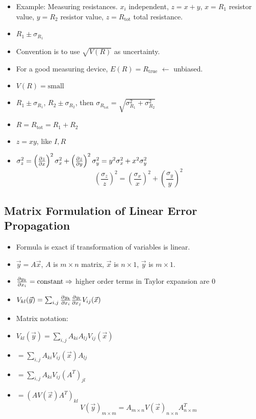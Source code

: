 \begin{itemize}
      \item Example: Measuring resistances. $x_i$ independent, $z = x + y$, $x=R_1$ resistor value, $y=R_2$ resistor value, $z=R_{\text{tot}}$ total resistance.
      \item $R_1 \pm \sigma_{R_1}$
      \item Convention is to use $\sqrt{V(R)}$ as uncertainty.
      \item For a good measuring device, $E(R) = R_{\text{true}}$ $\leftarrow$ unbiased.
      \item $V(R) = \text{small}$
      \item $R_1 \pm \sigma_{R_1}$, $R_2 \pm \sigma_{R_2}$, then $\sigma_{R_{\text{tot}}} = \sqrt{\sigma_{R_1}^2 + \sigma_{R_2}^2}$
      \item $R = R_{\text{tot}} = R_1 + R_2$
      \item $z = xy$, like $I, R$
      \item $\sigma_z^2 = \left(\pdv{z}{x} \right)^2 \sigma_x^2 + \left(\pdv{z}{y} \right)^2 \sigma_y^2 = y^2 \sigma_x^2 + x^2 \sigma_y^2$
            \[ \boxed{ \left(\frac{\sigma_z}{z} \right)^2 = \left(\frac{\sigma_x}{x} \right)^2 + \left(\frac{\sigma_y}{y} \right)^2 } \]
\end{itemize}

\subsection{Matrix Formulation of Linear Error Propagation}

\begin{itemize}
      \item Formula is exact if transformation of variables is linear.
      \item $\vec{y} = A \vec{x}$, $A$ is $m \times n$ matrix, $\vec{x}$ is $n \times 1$, $\vec{y}$ is $m \times 1$.
      \item $\pdv{y_k}{x_i} = \text{constant} \Rightarrow$ higher order terms in Taylor expansion are $0$
      \item $V_{kl}(\vec{y}) = \sum_{i,j} \pdv{y_k}{x_i} \pdv{y_l}{x_j} V_{ij}(\vec{x})$
      \item Matrix notation:
      \item $V_{kl}(\vec{y})  = \sum_{i,j} A_{ki} A_{lj} V_{ij}(\vec{x})$
      \item $ = \sum_{i,j} A_{ki} V_{ij}(\vec{x}) A_{lj}$
      \item $ = \sum_{i,j} A_{ki} V_{ij} (A^T)_{jl}$
      \item $ = (A V(\vec{x}) A^T)_{kl}$
            \[ \boxed{ V(\vec{y})_{m \times m} = A_{m \times n} V(\vec{x})_{n \times n} A^T_{n \times m} } \]
\end{itemize}

